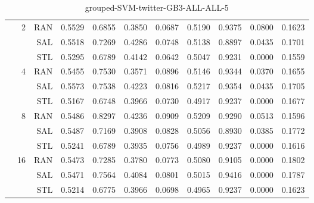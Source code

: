 \begin{center}
\begin{table}[htbp]
\begin{center}
\begin{tabular}{ | r | r | r | r | r | r | r | r | r | r | r |}
 & \multirow{3}{*}{2} & RAN & 0.5529 & 0.6855 & 0.3850 & 0.0687 & 0.5190 & 0.9375 & 0.0800 & 0.1623\\ \cline{3-11}
 &   & SAL & 0.5518 & 0.7269 & 0.4286 & 0.0748 & 0.5138 & 0.8897 & 0.0435 & 0.1701\\ \cline{3-11}
 &   & STL & 0.5295 & 0.6789 & 0.4142 & 0.0642 & 0.5047 & 0.9231 & 0.0000 & 0.1559\\ \cline{2-11}
 & \multirow{3}{*}{4} & RAN & 0.5455 & 0.7530 & 0.3571 & 0.0896 & 0.5146 & 0.9344 & 0.0370 & 0.1655\\ \cline{3-11}
 &   & SAL & 0.5573 & 0.7538 & 0.4223 & 0.0816 & 0.5217 & 0.9354 & 0.0435 & 0.1705\\ \cline{3-11}
 &   & STL & 0.5167 & 0.6748 & 0.3966 & 0.0730 & 0.4917 & 0.9237 & 0.0000 & 0.1677\\ \cline{2-11}
 & \multirow{3}{*}{8} & RAN & 0.5486 & 0.8297 & 0.4236 & 0.0909 & 0.5209 & 0.9290 & 0.0513 & 0.1596\\ \cline{3-11}
 &   & SAL & 0.5487 & 0.7169 & 0.3908 & 0.0828 & 0.5056 & 0.8930 & 0.0385 & 0.1772\\ \cline{3-11}
 &   & STL & 0.5241 & 0.6789 & 0.3935 & 0.0756 & 0.4989 & 0.9237 & 0.0000 & 0.1616\\ \cline{2-11}
 & \multirow{3}{*}{16} & RAN & 0.5473 & 0.7285 & 0.3780 & 0.0773 & 0.5080 & 0.9105 & 0.0000 & 0.1802\\ \cline{3-11}
 &   & SAL & 0.5471 & 0.7564 & 0.4084 & 0.0801 & 0.5015 & 0.9416 & 0.0000 & 0.1787\\ \cline{3-11}
 &   & STL & 0.5214 & 0.6775 & 0.3966 & 0.0698 & 0.4965 & 0.9237 & 0.0000 & 0.1623\\ \cline{2-11}
\hline
\end{tabular}
\caption{grouped-SVM-twitter-GB3-ALL-ALL-5}
\end{center}
 \end{table}
\end{center}

